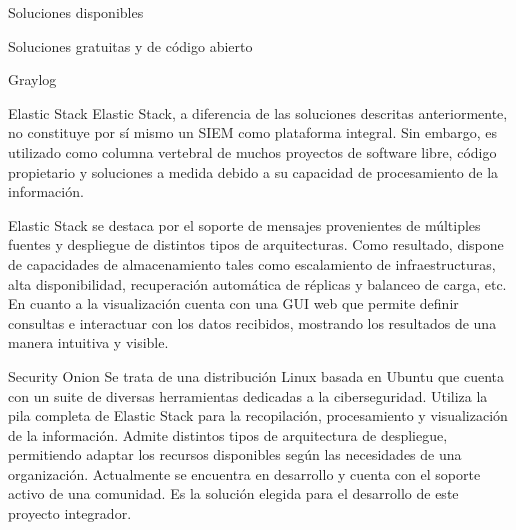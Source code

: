 \begin{section}{Soluciones disponibles}
\begin{subsection}{Soluciones gratuitas y de código abierto}
\begin{subsubsection}{Graylog}
            \end{subsubsection}
            \begin{subsubsection}{Elastic Stack}
            Elastic Stack\cite{elastic}, a diferencia de las soluciones descritas anteriormente, no constituye por sí mismo un SIEM como plataforma integral. Sin embargo, es utilizado como columna vertebral de muchos proyectos de software libre, código propietario y soluciones a medida debido a su capacidad de procesamiento de la información. \par
        	Elastic Stack se destaca por el soporte de mensajes provenientes de múltiples fuentes y despliegue de distintos tipos de arquitecturas. Como resultado, dispone de capacidades de almacenamiento tales como escalamiento de infraestructuras, alta disponibilidad, recuperación automática de réplicas y balanceo de carga, etc. En cuanto a la visualización cuenta con una GUI web que permite definir consultas e interactuar con los datos recibidos, mostrando los resultados de una manera intuitiva y visible. 

            \end{subsubsection}
            \begin{subsubsection}{Security Onion}
            Se trata de una distribución Linux basada en Ubuntu \cite{ubuntu} que cuenta con un suite de diversas herramientas dedicadas a la ciberseguridad. Utiliza la pila completa de Elastic Stack para la recopilación, procesamiento y visualización de la información. Admite distintos tipos de arquitectura de despliegue, permitiendo adaptar los recursos disponibles según las necesidades de una organización. Actualmente se encuentra en desarrollo y cuenta con el soporte activo de una comunidad. Es la solución elegida para el desarrollo de este proyecto integrador.
            \end{subsubsection}
            
        \end{subsection} 
    \end{section}
